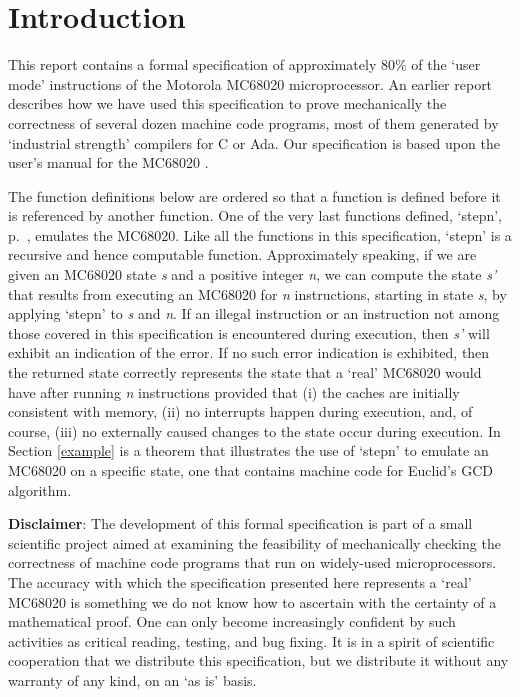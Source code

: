 \section{Introduction}

This report contains a formal specification of
approximately 80\% of the `user mode' instructions of the Motorola MC68020
microprocessor.  An earlier report \cite{Boyer-Yu-91} describes how we have
used this specification to prove mechanically the correctness of several dozen
machine code programs, most of them generated by `industrial strength'
compilers for C or Ada.  Our specification is based upon the user's manual
for the MC68020 \cite{m20}.

The function definitions below are ordered so that a function is defined before
it is referenced by another function.  One of the very last functions defined,
`stepn', p.~\pageref{stepn}, emulates the MC68020.  Like all the functions in
this specification, `stepn' is a recursive and hence computable function.
Approximately speaking, if we are given an MC68020 state {\it{s\/}} and a positive
integer {\it{n\/}}, we can compute the state {\em s'} that results from executing an
MC68020 for {\it{n\/}} instructions, starting in state {\it{s\/}}, by applying `stepn' to {\it{s\/}}
and {\it{n\/}}.  If an illegal instruction or an instruction not among those covered
in this specification is encountered during execution, then {\em s'} will
exhibit an indication of the error.  If no such error indication is exhibited,
then the returned state correctly represents the state that a `real' MC68020
would have after running {\it{n\/}} instructions provided that (i) the caches are
initially consistent with memory, (ii) no interrupts happen during execution,
and, of course, (iii) no externally caused changes to the state occur during
execution.  In Section \ref{example} is a theorem that illustrates the use of
`stepn' to emulate an MC68020 on a specific state, one that contains machine
code for Euclid's GCD algorithm.

{\bf Disclaimer}: The development of this formal specification is part of a
small scientific project aimed at examining the feasibility of mechanically
checking the correctness of machine code programs that run on widely-used
microprocessors.  The accuracy with which the specification presented here
represents a `real' MC68020 is something we do not know how to ascertain with
the certainty of a mathematical proof.  One can only become increasingly
confident by such activities as critical reading, testing, and bug fixing.  It
is in a spirit of scientific cooperation that we distribute this specification,
but we distribute it without any warranty of any kind, on an `as is' basis.

